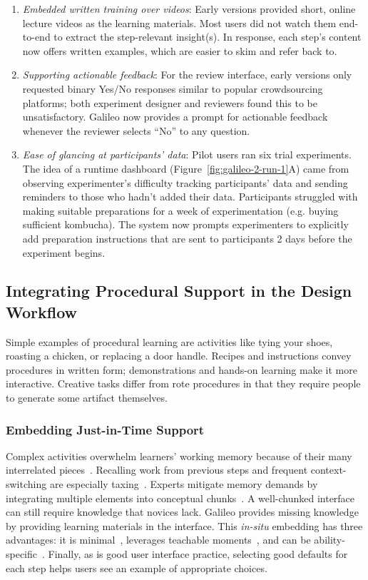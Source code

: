 \begin{enumerate}
\item \textit{Embedded written training over videos}: Early versions provided short, online lecture videos as the learning materials. Most users did not watch them end-to-end to extract the step-relevant insight(s). In response, each step's content now offers written examples, which are easier to skim and refer back to. 

\item \textit{Supporting actionable feedback}: For the review interface, early versions only requested binary Yes/No responses similar to popular crowdsourcing platforms; both experiment designer and reviewers found this to be unsatisfactory. Galileo now provides a prompt for actionable feedback whenever the reviewer selects “No” to any question. 

\item \textit{Ease of glancing at participants' data}: Pilot users ran six trial experiments. The idea of a runtime dashboard (Figure~\ref{fig:galileo-2-run-1}A) came from observing experimenter's difficulty tracking participants' data and sending reminders to those who hadn't added their data. Participants struggled with making suitable preparations for a week of experimentation (e.g. buying sufficient kombucha). The system now prompts experimenters to explicitly add preparation instructions that are sent to participants 2 days before the experiment begins. 
\end{enumerate}

\subsection{Integrating Procedural Support in the Design Workflow}
Simple examples of procedural learning are activities like tying your shoes, roasting a chicken, or replacing a door handle. Recipes and instructions convey procedures in written form; demonstrations and hands-on learning make it more interactive. Creative tasks differ from rote procedures in that they require people to generate some artifact themselves.

\subsubsection{Embedding Just-in-Time Support}
Complex activities overwhelm learners' working memory because of their many interrelated pieces~\cite{Engle2002}. Recalling work from previous steps and frequent context-switching are especially taxing~\cite{Gonzalez2004}. Experts mitigate memory demands by integrating multiple elements into conceptual chunks~\cite{Chase1973}. A well-chunked interface can still require knowledge that novices lack. Galileo provides missing knowledge by providing learning materials in the interface. This \textit{in-situ} embedding has three advantages: it is minimal~\cite{Carroll1987}, leverages teachable moments~\cite{Havighurst1953}, and can be ability-specific~\cite{Corbett1997}. Finally, as is good user interface practice, selecting good defaults for each step helps users see an example of appropriate choices. 

